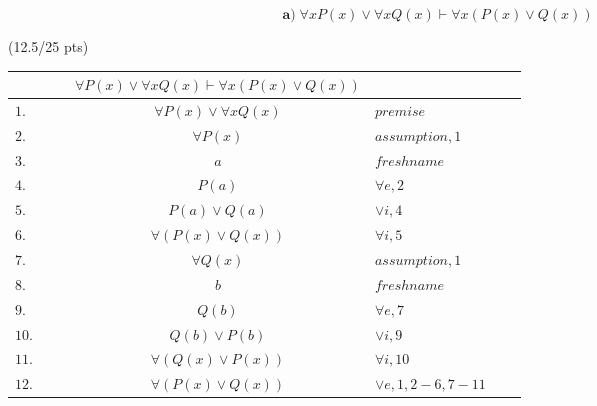 \documentclass[a4paper,12pt]{article}
\begin{document}
\begin{equation*}
    \textbf{a)} \; \forall x P(x) \vee \forall x Q(x) \vdash \forall x (P(x) \vee Q(x)) 
\end{equation*}

\hfill \small{(12.5/25 pts)}\\
\begin{tcolorbox}
    \begin{tabular}{lllclrr}
        & & & $\forall P(x)\lor \forall x Q(x) \vdash \forall x (P(x)\lor Q(x))$ & & & \\
        \hline
        $1.$ & & & $\forall P(x)\lor \forall x Q(x)$ & $premise$ & & \\
        \cline{2-7}
        $2.$ & \multicolumn{1}{|c}{} & & $\forall P(x)$ & $assumption, 1$ & & \multicolumn{1}{c|}{} \\
        \cline{3-6}
        $3.$ & \multicolumn{1}{|c}{} & \multicolumn{1}{|c}{} & $a$ & $fresh name$ & \multicolumn{1}{c|}{} & \multicolumn{1}{c|}{} \\
        $4.$ & \multicolumn{1}{|c}{} & \multicolumn{1}{|c}{} & $P(a)$ & $\forall e, 2$ & \multicolumn{1}{c|}{} & \multicolumn{1}{c|}{} \\
        $5.$ & \multicolumn{1}{|c}{} & \multicolumn{1}{|c}{} & $P(a) \lor Q(a)$ & $\lor i, 4$ & \multicolumn{1}{c|}{} & \multicolumn{1}{c|}{} \\
        \cline{3-6}
        $6.$ & \multicolumn{1}{|c}{} & & $\forall (P(x)\lor Q(x))$ & $\forall i, 5$ & & \multicolumn{1}{c|}{} \\
        \cline{2-7}
        \cline{2-7}
        $7.$ & \multicolumn{1}{|c}{} & & $\forall Q(x)$ & $assumption, 1$ & & \multicolumn{1}{c|}{} \\
        \cline{3-6}
        $8.$ & \multicolumn{1}{|c}{} & \multicolumn{1}{|c}{} & $b$ & $fresh name$ & \multicolumn{1}{c|}{} & \multicolumn{1}{c|}{} \\
        $9.$ & \multicolumn{1}{|c}{} & \multicolumn{1}{|c}{} & $Q(b)$ & $\forall e, 7$ & \multicolumn{1}{c|}{} & \multicolumn{1}{c|}{} \\
        $10.$ & \multicolumn{1}{|c}{} & \multicolumn{1}{|c}{} & $Q(b) \lor P(b)$ & $\lor i, 9$ & \multicolumn{1}{c|}{} & \multicolumn{1}{c|}{} \\
        \cline{3-6}
        $11.$ & \multicolumn{1}{|c}{} & & $\forall (Q(x)\lor P(x))$ & $\forall i, 10$ & & \multicolumn{1}{c|}{} \\
        \cline{2-7}
        
        $12.$ & & & $\forall (P(x)\lor Q(x))$ & $\lor e, 1,2-6,7-11$ & & \\
    \end{tabular}
\end{tcolorbox}
\end{document}

